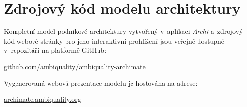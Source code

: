 \chapter{Zdrojový kód modelu architektury}
\label{app:archimate-repo}

Kompletní model podnikové architektury vytvořený v~aplikaci \textit{Archi} a~zdrojový kód webové stránky pro jeho interaktivní prohlížení jsou veřejně dostupné v~repozitáři na platformě GitHub:

\begin{center}
\href{https://github.com/ambiquality/ambiquality-archimate}{github.com/ambiquality/ambiquality-archimate}
\end{center}

Vygenerovaná webová prezentace modelu je hostována na adrese:

\begin{center}
\href{https://archimate.ambiquality.org}{archimate.ambiquality.org}
\end{center}
